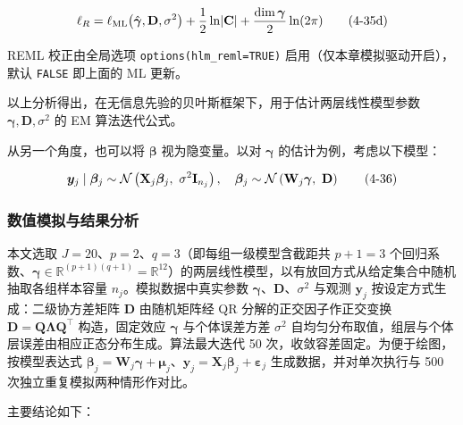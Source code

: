 \documentclass[12pt,a4paper]{ctexart}
\makeatletter
\numberwithin{figure}{section}
\numberwithin{table}{section}
\let\ltx@orig@tag\tag
\renewcommand{\tag}[1]{\refstepcounter{equation}\ltx@orig@tag{#1}}%
\makeatother
\begin{document}
\begin{equation}
\ell_{R}=\ell_{\mathrm{ML}}\!\left(\hat{\boldsymbol{\gamma}},\mathbf{D},\sigma^{2}\right)+\frac{1}{2}\ln\lvert\mathbf{C}\rvert+\frac{\dim\boldsymbol{\gamma}}{2}\ln(2\pi) \tag{4-35d}
\end{equation}

REML 校正由全局选项 \texttt{options(hlm\_reml=TRUE)} 启用（仅本章模拟驱动开启），默认 \texttt{FALSE} 即上面的 ML 更新。

以上分析得出，在无信息先验的贝叶斯框架下，用于估计两层线性模型参数 $\boldsymbol{\gamma},\mathbf{D},\sigma^{2}$ 的 EM 算法迭代公式。

从另一个角度，也可以将 $\boldsymbol{\beta}$ 视为隐变量。以对 $\boldsymbol{\gamma}$ 的估计为例，考虑以下模型：

\begin{equation}
\boldsymbol{y}_{j}\mid\boldsymbol{\beta}_{j}\sim\mathcal{N}\left(\mathbf{X}_{j}\boldsymbol{\beta}_{j},\ \sigma^{2}\mathbf{I}_{n_{j}}\right),\quad \boldsymbol{\beta}_{j}\sim\mathcal{N}\left(\mathbf{W}_{j}\boldsymbol{\gamma},\ \mathbf{D}\right) \tag{4-36}
\end{equation}

\subsubsection{数值模拟与结果分析}

本文选取 $J=20$、$p=2$、$q=3$（即每组一级模型含截距共 $p+1=3$ 个回归系数、$\boldsymbol{\gamma}\in\mathbb{R}^{(p+1)(q+1)}=\mathbb{R}^{12}$）的两层线性模型，以有放回方式从给定集合中随机抽取各组样本容量 $n_j$。模拟数据中真实参数 $\boldsymbol{\gamma}$、$\boldsymbol{D}$、$\sigma^2$ 与观测 $\boldsymbol{y}_j$ 按设定方式生成：二级协方差矩阵 $\boldsymbol{D}$ 由随机矩阵经 QR 分解的正交因子作正交变换 $\boldsymbol{D}=\boldsymbol{Q}\boldsymbol{\Lambda}\boldsymbol{Q}^{\top}$ 构造，固定效应 $\boldsymbol{\gamma}$ 与个体误差方差 $\sigma^2$ 自均匀分布取值，组层与个体层误差由相应正态分布生成。算法最大迭代 50 次，收敛容差固定。为便于绘图，按模型表达式 $\boldsymbol{\beta}_j=\boldsymbol{W}_j\boldsymbol{\gamma}+\boldsymbol{\mu}_j$、$\boldsymbol{y}_j=\boldsymbol{X}_j\boldsymbol{\beta}_j+\boldsymbol{\varepsilon}_j$ 生成数据，并对单次执行与 500 次独立重复模拟两种情形作对比。

主要结论如下：
\end{document}

